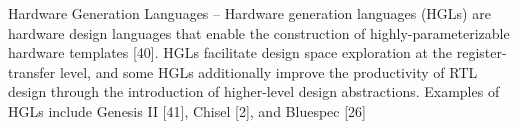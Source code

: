                     
        





Hardware Generation Languages – Hardware generation languages (HGLs) are hardware design languages that
enable the construction of highly-parameterizable hardware
templates [40]. HGLs facilitate design space exploration at
the register-transfer level, and some HGLs additionally improve the productivity of RTL design through the introduction of higher-level design abstractions. Examples of HGLs
include Genesis II [41], Chisel [2], and Bluespec [26]


